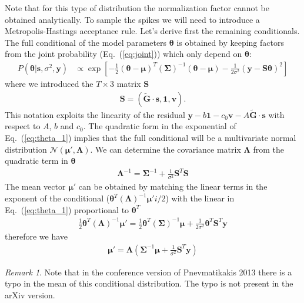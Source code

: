 \documentclass{article}
\theoremstyle{remark}
\newtheorem{remark}{Remark}
\begin{document}
Note that for this type of distribution the normalization factor cannot be obtained analytically. To sample the spikes we will need to introduce a Metropolis-Hastings acceptance rule. Let's derive first the remaining conditionals. The full conditional of the model parameters $\bm{\theta}$ is obtained by keeping factors from the joint probability (Eq.~(\ref{eq:joint})) which only depend on $\bm{\theta}$:
\begin{align}
    P(\bm{\theta} | \bm{s},\sigma^2,\bm{y}) &\propto \exp\left[-\frac{1}{2} (\bm{\theta}-\bm{\mu})^T(\bm\Sigma)^{-1}(\bm\theta-\bm\mu)-\frac{1}{2\sigma^2}(\bm y-\bm S \bm\theta)^2\right] \label{eq:theta_1}
\end{align}
where we introduced the $T\times3$ matrix $\bm S$ 
\begin{align}
    \bm S = (\bm{\tilde G}\cdot\bm{s},\bm{1},\bm v).
\end{align}
This notation exploits the linearity of the residual $\bm{y}-b\bm{1} - c_0 \bm{v}-A\bm{\tilde G}\cdot \bm{s}$ with respect to $A$, $b$ and $c_0$.
The quadratic form in the exponential of Eq.~(\ref{eq:theta_1}) implies that the full conditional will be a multivariate normal distribution $\mathcal{N}(\bm\mu',\bm\Lambda)$. We can determine the covariance matrix $\bm\Lambda$ from the quadratic term in $\bm\theta$
\begin{align}
    \bm{\Lambda}^{-1} = \bm{\Sigma}^{-1}+\frac{1}{\sigma^2}\bm{S}^T \bm{S}
\end{align}
The mean vector $\bm\mu'$ can be obtained by matching the linear terms in the exponent of the conditional ($\bm\theta^T(\bm\Lambda)^{-1}\bm\mu'i/2$) with the linear in Eq.~(\ref{eq:theta_1}) proportional to $\bm\theta^T$
\begin{align}
    \frac{1}{2}\bm\theta^T(\bm\Lambda)^{-1}\bm\mu' = \frac{1}{2}\bm\theta^T(\bm\Sigma)^{-1}\bm\mu+\frac{1}{2\sigma^2}\bm{\theta}^T\bm{S}^T\bm{y}
\end{align}
therefore we have
\begin{align}
    \bm\mu'=\bm\Lambda\left(\bm\Sigma^{-1}\bm\mu+\frac{1}{\sigma^2}\bm{S}^T\bm{y}\right)
\end{align}
\begin{tcolorbox}
    \begin{remark}
    Note that in the conference version of Pnevmatikakis 2013 there is a typo in the mean of this conditional distribution. The typo is not present in the arXiv version.
    \end{remark}
\end{tcolorbox}
\end{document}
